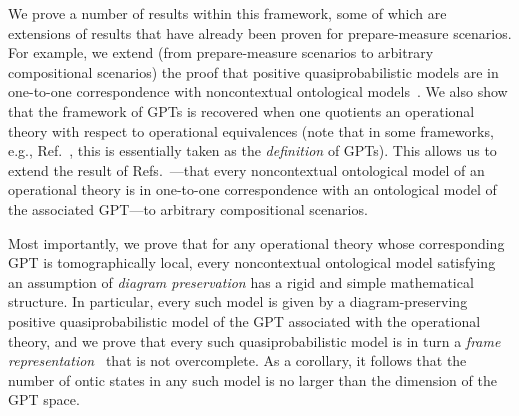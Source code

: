 \documentclass[onecolum,aps,groupedaddress,nofootinbib]{revtex4-2}
\newcommand{\david}{\color{blue}}
\newcommand{\blk}{\color{black}}
\newcommand{\rnote}[1]{{\color{cyan}[Rob: #1]}}
\begin{document}
We prove a number of results within this framework, some of which are extensions of results that have already been proven for prepare-measure scenarios.
For example, we extend (from prepare-measure scenarios to arbitrary compositional scenarios)
 the proof that positive quasiprobabilistic models are in one-to-one correspondence with
noncontextual ontological models~\cite{Spekkens2008}.
We also show that  the framework of GPTs is recovered when one quotients an operational theory with respect to operational equivalences (note that in some frameworks, e.g., Ref.~\cite{chiribella2010probabilistic}, this is essentially taken as the {\em definition} of GPTs).
This allows us to extend the result of Refs.~\cite{schmid2019characterization,shahandeh2019contextuality}---that every noncontextual ontological model of an operational theory is in one-to-one correspondence with an ontological model of the associated GPT---to arbitrary compositional scenarios.

 Most importantly, we prove that for any operational theory whose corresponding GPT is tomographically local, every noncontextual ontological model satisfying an assumption of {\em diagram preservation}  has a rigid and simple mathematical structure. 
In particular, every such model is given by a diagram-preserving positive quasiprobabilistic model of the GPT associated with the operational theory, and we prove that every such quasiprobabilistic model is in turn a {\em frame representation}~\cite{ferrie2008frame,Ferrie_2009} that is not overcomplete.
As a corollary, it follows that the number of ontic states in any such model is no larger than the dimension of the GPT space.
\end{document}
